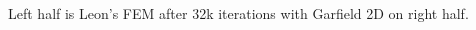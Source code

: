 \documentclass[xcolor=dvipsnames]{beamer}
\begin{document}
\begin{frame}
\begin{columns}
\begin{column}{0.5\textwidth}
\begin{center}
        \scriptsize Left half is Leon's FEM after 32k iterations with Garfield 2D on right half.
      \end{center}

    \end{column}
  \end{columns}

  

\end{frame}
\end{document}
